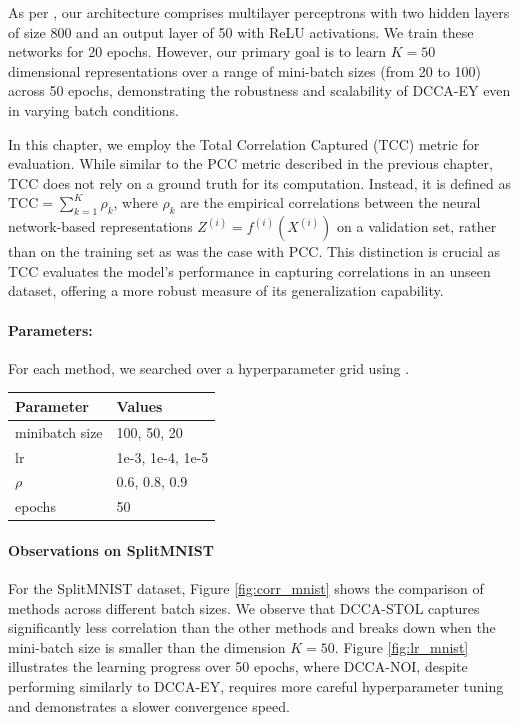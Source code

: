 As per \citet{wang2015stochastic}, our architecture comprises multilayer perceptrons with two hidden layers of size 800 and an output layer of 50 with ReLU activations. We train these networks for 20 epochs. However, our primary goal is to learn $K=50$ dimensional representations over a range of mini-batch sizes (from 20 to 100) across 50 epochs, demonstrating the robustness and scalability of DCCA-EY even in varying batch conditions.

In this chapter, we employ the Total Correlation Captured (TCC) metric for evaluation. While similar to the PCC metric described in the previous chapter, TCC does not rely on a ground truth for its computation. Instead, it is defined as \( \text{TCC} = \sum_{k=1}^K \rho_k \), where $\rho_k$ are the empirical correlations between the neural network-based representations $Z^{(i)} = f^{(i)}(X^{(i)})$ on a validation set, rather than on the training set as was the case with PCC. This distinction is crucial as TCC evaluates the model's performance in capturing correlations in an unseen dataset, offering a more robust measure of its generalization capability.

\paragraph{Parameters:} For each method, we searched over a hyperparameter grid using \citet{wandb}.

\begin{table}[h!]
    \centering
    \begin{tabular}{|l|l|}
        \hline Parameter           & Values           \\
        \hline minibatch size      & 100, 50, 20      \\
        \hline lr                  & 1e-3, 1e-4, 1e-5 \\
        \hline $\rho$\footnotemark & 0.6, 0.8, 0.9    \\
        \hline epochs              & 50               \\
        \hline
    \end{tabular}
\end{table}

\paragraph{Observations on SplitMNIST}
For the SplitMNIST dataset, Figure \ref{fig:corr_mnist} shows the comparison of methods across different batch sizes. We observe that DCCA-STOL captures significantly less correlation than the other methods and breaks down when the mini-batch size is smaller than the dimension $K=50$. Figure \ref{fig:lr_mnist} illustrates the learning progress over 50 epochs, where DCCA-NOI, despite performing similarly to DCCA-EY, requires more careful hyperparameter tuning and demonstrates a slower convergence speed.

